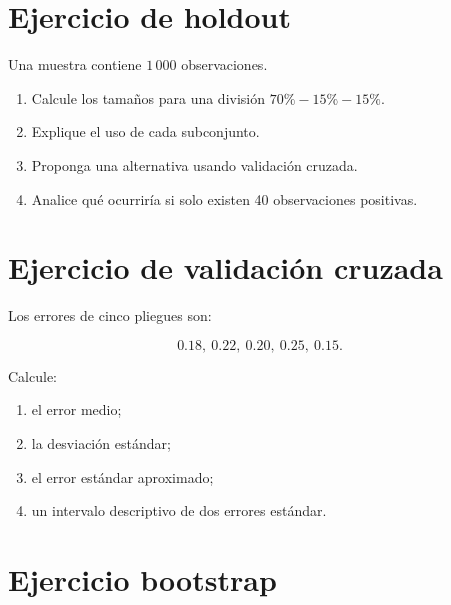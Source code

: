 \documentclass[
  spanish,
  10.5pt,
  letterpaper,
  DIV=11,
  numbers=noendperiod,
  oneside,
  open=any]{scrreprt}
\providecommand{\tightlist}{%
  \setlength{\itemsep}{0pt}\setlength{\parskip}{0pt}}
\theoremstyle{definition}
\theoremstyle{definition}
\theoremstyle{plain}
\theoremstyle{remark}
\begin{document}
\section*{Ejercicio de holdout}\label{ejercicio-de-holdout}


Una muestra contiene \(1\,000\) observaciones.

\begin{enumerate}
\def\labelenumi{\arabic{enumi}.}
\tightlist
\item
  Calcule los tamaños para una división \(70\%-15\%-15\%\).
\item
  Explique el uso de cada subconjunto.
\item
  Proponga una alternativa usando validación cruzada.
\item
  Analice qué ocurriría si solo existen 40 observaciones positivas.
\end{enumerate}

\section*{Ejercicio de validación
cruzada}\label{ejercicio-de-validaciuxf3n-cruzada}


Los errores de cinco pliegues son:

\[
0.18,\ 0.22,\ 0.20,\ 0.25,\ 0.15.
\]

Calcule:

\begin{enumerate}
\def\labelenumi{\arabic{enumi}.}
\tightlist
\item
  el error medio;
\item
  la desviación estándar;
\item
  el error estándar aproximado;
\item
  un intervalo descriptivo de dos errores estándar.
\end{enumerate}

\section*{Ejercicio bootstrap}\label{ejercicio-bootstrap}

\end{document}

